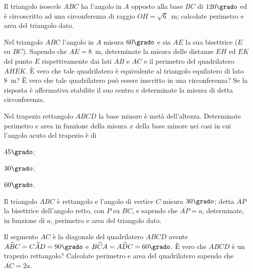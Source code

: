 \begin{multicols}{2}
\begin{esercizio}
\label{ese:7.30}
Il triangolo isoscele \(ABC\) ha l'angolo in \(A\) opposto alla base \(BC\) 
di \(120\grado\) ed è circoscritto ad una circonferenza di raggio 
\(OH=\sqrt{6}\)~m; calcolate perimetro e area del triangolo dato.
\end{esercizio}

\begin{esercizio}
\label{ese:7.31}
Nel triangolo \(ABC\) l'angolo in \(A\) misura \(60\grado\) e sia \(AE\) la 
sua bisettrice (\(E\) su \(BC\)). Sapendo che \(AE=8\)~m, determinate la 
misura delle distanze \(EH\) ed \(EK\) del punto \(E\) rispettivamente dai 
lati \(AB\) e \(AC\) e il perimetro del quadrilatero \(AHEK\). \`E vero che 
tale quadrilatero è equivalente al triangolo equilatero di lato 8~m? 
\`E vero che tale quadrilatero può essere inscritto in una 
circonferenza? Se la risposta è affermativa stabilite il suo centro e 
determinate la misura di detta circonferenza.
\end{esercizio}

\begin{esercizio}
\label{ese:7.32}
Nel trapezio rettangolo \(ABCD\) la base minore è metà dell'altezza. 
Determinate perimetro e area in funzione della misura \(x\) della base 
minore nei casi in cui l'angolo acuto del trapezio è di
\begin{enumeratea}
\item \(45\grado\);
\item \(30\grado\);
\item \(60\grado\).
\end{enumeratea}
\end{esercizio}

\begin{esercizio}
\label{ese:7.33}
Il triangolo \(ABC\) è rettangolo e l'angolo di vertice \(C\) misura 
\(30\grado\); detta \(AP\) la bisettrice dell'angolo retto, con \(P\) su 
\(BC\), e sapendo che \(\overline{AP}=a\), determinate, in funzione di 
\(a\), perimetro e area del triangolo dato.
\end{esercizio}

\begin{esercizio}
\label{ese:7.34}
Il segmento \(AC\) è la diagonale del quadrilatero \(ABCD\) avente 
\(A\widehat{B}C=C\widehat{A}D=90\grado\) e 
\(B\widehat{C}A=A\widehat{D}C=60\grado\). \`E vero che \(ABCD\) è un 
trapezio rettangolo? Calcolate perimetro e area del quadrilatero 
sapendo che \(\overline{AC}=2a\).
\end{esercizio}


\end{multicols}
